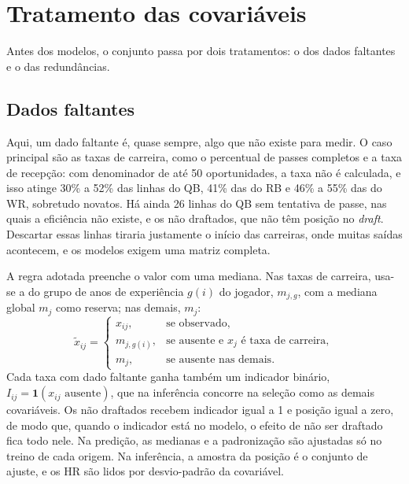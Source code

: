 \section{Tratamento das covariáveis}
\label{sec:selecao_faltantes}

Antes dos modelos, o conjunto passa por dois tratamentos: o dos dados faltantes e o das redundâncias.

\subsection{Dados faltantes}
\label{subsec:imputacao}

Aqui, um dado faltante é, quase sempre, algo que não existe para medir. O caso principal são as taxas de carreira, como o percentual de passes completos e a taxa de recepção: com denominador de até 50 oportunidades, a taxa não é calculada, e isso atinge 30\% a 52\% das linhas do QB, 41\% das do RB e 46\% a 55\% das do WR, sobretudo novatos. Há ainda 26 linhas do QB sem tentativa de passe, nas quais a eficiência não existe, e os não draftados, que não têm posição no \textit{draft}. Descartar essas linhas tiraria justamente o início das carreiras, onde muitas saídas acontecem, e os modelos exigem uma matriz completa.

A regra adotada preenche o valor com uma mediana. Nas taxas de carreira, usa-se a do grupo de anos de experiência $g(i)$ do jogador, $m_{j,g}$, com a mediana global $m_j$ como reserva; nas demais, $m_j$:
\begin{equation}
    \tilde{x}_{ij} = \begin{cases} x_{ij}, & \text{se observado}, \\ m_{j,g(i)}, & \text{se ausente e $x_j$ é taxa de carreira}, \\ m_j, & \text{se ausente nas demais}. \end{cases}
    \label{eq:missing}
\end{equation}
Cada taxa com dado faltante ganha também um indicador binário, $I_{ij} = \mathbf{1}(x_{ij} \text{ ausente})$, que na inferência concorre na seleção como as demais covariáveis. Os não draftados recebem indicador igual a 1 e posição igual a zero, de modo que, quando o indicador está no modelo, o efeito de não ser draftado fica todo nele. Na predição, as medianas e a padronização são ajustadas só no treino de cada origem. Na inferência, a amostra da posição é o conjunto de ajuste, e os HR são lidos por desvio-padrão da covariável.

